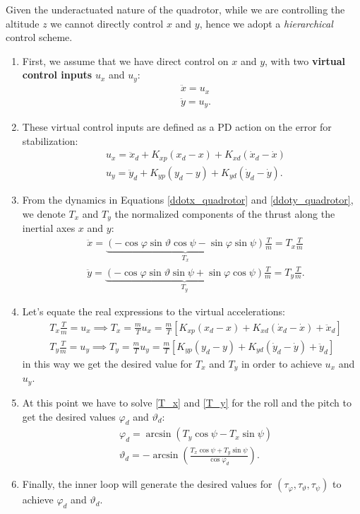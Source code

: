 \documentclass[10pt, a4paper]{report}
\begin{document}
Given the underactuated nature of the quadrotor, while we are controlling the altitude $z$ we cannot directly control $x$ and $y$, hence we adopt a \textit{hierarchical} control scheme.
\begin{enumerate}
    \item First, we assume that we have direct control on $x$ and $y$, with two \textbf{virtual control inputs} $u_x$ and $u_y$:\begin{align}
        &\ddot x=u_x\\ 
        &\ddot y=u_y.
    \end{align}
    \item These virtual control inputs are defined as a PD action on the error for stabilization:\begin{align}
        &u_x=\ddot x_d+K_{xp}(x_d-x)+K_{xd}(\dot x_d-\dot x)\\
        &u_y=\ddot y_d+K_{yp}(y_d-y)+K_{yd}(\dot y_d-\dot y).
    \end{align}
    \item From the dynamics in Equations \eqref{ddotx_quadrotor} and \eqref{ddoty_quadrotor}, we denote $T_x$ and $T_y$ the normalized components of the thrust along the inertial axes $x$ and $y$:\begin{align}
        &\ddot{x} = \underbrace{(-\cos\varphi \sin\vartheta \cos\psi - \sin\varphi \sin\psi)}_{T_x} \frac{T}{m}=T_x\frac{T}{m}\label{T_x}\\
        &\ddot{y} = \underbrace{(-\cos\varphi \sin\vartheta \sin\psi + \sin\varphi \cos\psi)}_{T_y} \frac{T}{m}=T_y\frac{T}{m}.\label{T_y}
    \end{align}
    \item Let's equate the real expressions to the virtual accelerations:\begin{align}
        &T_x \frac{T}{m} = u_x \implies T_x = \frac{m}{T} u_x = \frac{m}{T} \left[ K_{xp}(x_d - x) + K_{xd}(\dot{x}_d - \dot{x}) + \ddot{x}_d \right]\\
        &T_y \frac{T}{m} = u_y \implies T_y = \frac{m}{T} u_y = \frac{m}{T} \left[ K_{yp}(y_d - y) + K_{yd}(\dot{y}_d - \dot{y}) + \ddot{y}_d \right]
    \end{align}
    in this way we get the desired value for $T_x$ and $T_y$ in order to achieve $u_x$ and $u_y$.
    \item At this point we have to solve \eqref{T_x} and \eqref{T_y} for the roll and the pitch to get the desired values $\varphi_d$ and $\vartheta_d$:\begin{align}
        &\varphi_d=\arcsin\left(T_y\cos\psi-T_x\sin\psi\right)\\
        &\vartheta_d=-\arcsin\left(\frac{T_x\cos\psi+T_y\sin\psi}{\cos\varphi_d}\right).
    \end{align}
    \item Finally, the inner loop will generate the desired values for $(\tau_\varphi, \tau_\vartheta, \tau_\psi)$ to achieve $\varphi_d$ and $\vartheta_d$.
\end{enumerate}
\end{document}
